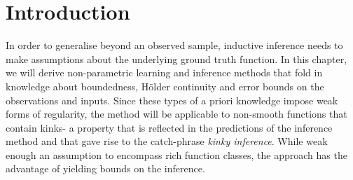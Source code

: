%

%
%
%
%
\vspace{-3em}
\section{Introduction}
In order to generalise beyond an observed sample, inductive inference needs to make assumptions about the underlying ground truth function. In this chapter, we will derive non-parametric learning and inference methods that fold in knowledge about boundedness, H\"older continuity and error bounds on the observations and inputs. Since these types of a priori knowledge impose weak forms of regularity, the method will be applicable to non-smooth functions that contain kinks- a property that is reflected in the predictions of the inference method and that gave rise to the catch-phrase \emph{kinky inference}.
While weak enough an assumption to encompass rich function classes, the approach has the advantage of yielding bounds on the inference.

